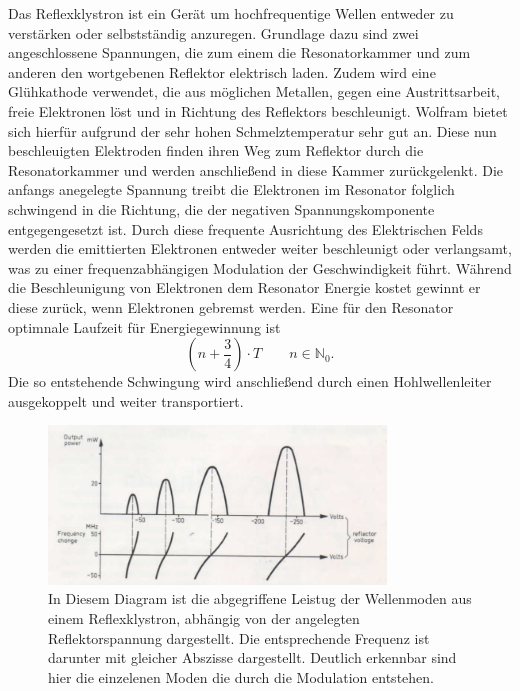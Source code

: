Das Reflexklystron ist ein Gerät um hochfrequentige Wellen entweder zu verstärken oder selbstständig anzuregen. Grundlage dazu sind zwei angeschlossene Spannungen, 
die zum einem die Resonatorkammer und zum anderen den wortgebenen Reflektor elektrisch laden. Zudem wird eine Glühkathode verwendet, die aus möglichen Metallen, 
gegen eine Austrittsarbeit, freie Elektronen löst und in Richtung des Reflektors beschleunigt. Wolfram bietet sich hierfür aufgrund der sehr hohen Schmelztemperatur sehr gut an.
Diese nun beschleuigten Elektroden finden ihren Weg zum Reflektor durch die Resonatorkammer und werden anschließend in diese Kammer zurückgelenkt. Die anfangs anegelegte Spannung treibt 
die Elektronen im Resonator folglich schwingend in die Richtung, die der negativen Spannungskomponente entgegengesetzt ist. Durch diese frequente Ausrichtung des Elektrischen Felds werden die emittierten Elektronen entweder weiter beschleunigt oder 
verlangsamt, was zu einer frequenzabhängigen Modulation der Geschwindigkeit führt. Während die Beschleunigung von Elektronen dem Resonator Energie kostet gewinnt er diese zurück, wenn Elektronen gebremst werden. 
Eine für den Resonator optimnale Laufzeit für Energiegewinnung ist 
\begin{equation}
    \left(n+ \frac{3}{4} \right) \cdot T  \quad \quad n \in \mathbb{N}_0.
\end{equation}
Die so entstehende Schwingung wird anschließend durch einen Hohlwellenleiter ausgekoppelt und weiter transportiert.
\begin{figure}
    \centering
    \includegraphics[width=0.8\textwidth]{bilder/dia.jpg}
    \caption{In Diesem Diagram ist die abgegriffene Leistug der Wellenmoden aus einem Reflexklystron, abhängig von der angelegten Reflektorspannung dargestellt.
    Die entsprechende Frequenz ist darunter mit gleicher Abszisse dargestellt. Deutlich erkennbar sind hier die einzelenen Moden die durch die Modulation entstehen.} 
    \label{fig:ref}
\end{figure}
